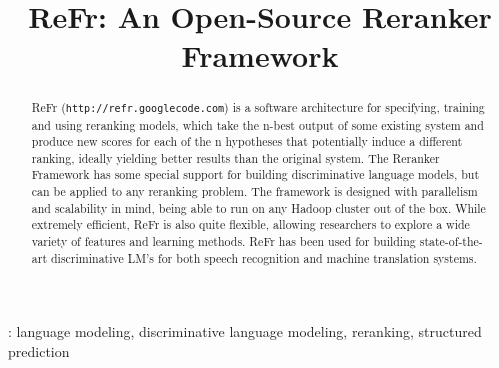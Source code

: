 \documentclass[a4paper]{article}
\title{ReFr: An Open-Source Reranker Framework}
\begin{document}
\maketitle
%
\begin{abstract}

ReFr (\texttt{http://refr.googlecode.com}) is a software architecture for specifying, training and using
reranking models, which take the n-best output of some
existing system and produce new scores for each of the n hypotheses
that potentially induce a different ranking, ideally yielding better
results than the original system. The Reranker Framework has some special support for building discriminative language
models, but can be applied to any reranking problem.  The framework is
designed with parallelism and scalability in mind, being able to run
on any Hadoop cluster out of the box.  While extremely efficient, ReFr
is also quite flexible, allowing researchers to explore a wide variety
of features and learning methods.  ReFr has been used for building
state-of-the-art discriminative LM's for both speech recognition and
machine translation systems.



\end{abstract}
: language modeling, discriminative language modeling, reranking, structured prediction
\end{document}
